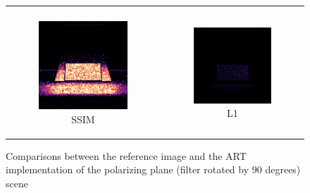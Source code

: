 \begin{figure}[h]
\begin{tabular}{cc}
\begin{subfigure}
			\caption{ART - our implementation}
		\end{subfigure} \\
		\begin{subfigure}
			{0.4\textwidth}\centering\includegraphics[width=\linewidth]{img/polarizing_plane_90_SSIM.png}
			\caption{SSIM}
		\end{subfigure} 
		&
		\begin{subfigure}
			{0.4\textwidth}\centering\includegraphics[width=\linewidth]{img/polarizing_plane_90_L1.png}
			\caption{L1}
		\end{subfigure}
	\end{tabular}
	\caption{Comparisons between the reference image and the ART implementation of the polarizing plane (filter rotated by 90 degrees) scene}
	\label{fig:compare_polar_angle}
\end{figure}

